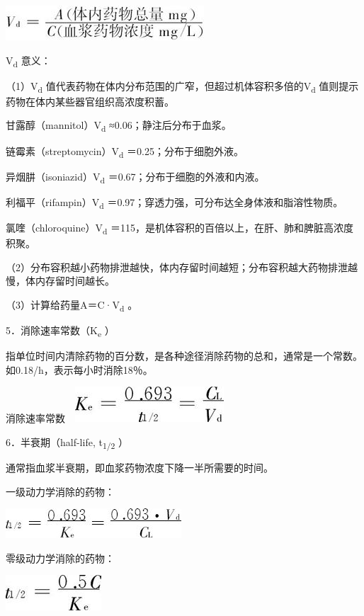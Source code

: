 \includegraphics{./images/Image00066.jpg}

V\textsubscript{d} 意义：

（1）V\textsubscript{d}
值代表药物在体内分布范围的广窄，但超过机体容积多倍的V\textsubscript{d}
值则提示药物在体内某些器官组织高浓度积蓄。

甘露醇（mannitol）V\textsubscript{d} ≈0.06；静注后分布于血浆。

链霉素（streptomycin）V\textsubscript{d} ＝0.25；分布于细胞外液。

异烟肼（isoniazid）V\textsubscript{d} ＝0.67；分布于细胞的外液和内液。

利福平（rifampin）V\textsubscript{d}
＝0.97；穿透力强，可分布达全身体液和脂溶性物质。

氯喹（chloroquine）V\textsubscript{d}
＝115，是机体容积的百倍以上，在肝、肺和脾脏高浓度积聚。

（2）分布容积越小药物排泄越快，体内存留时间越短；分布容积越大药物排泄越慢，体内存留时间越长。

（3）计算给药量A＝C·V\textsubscript{d} 。

5．消除速率常数（K\textsubscript{e} ）

指单位时间内清除药物的百分数，是各种途径消除药物的总和，通常是一个常数。如0.18/h，表示每小时消除18％。

消除速率常数　\includegraphics{./images/Image00067.jpg}

6．半衰期（half-life, t\textsubscript{1/2} ）

通常指血浆半衰期，即血浆药物浓度下降一半所需要的时间。

一级动力学消除的药物：

\includegraphics{./images/Image00068.jpg}

零级动力学消除的药物：

\includegraphics{./images/Image00069.jpg}

